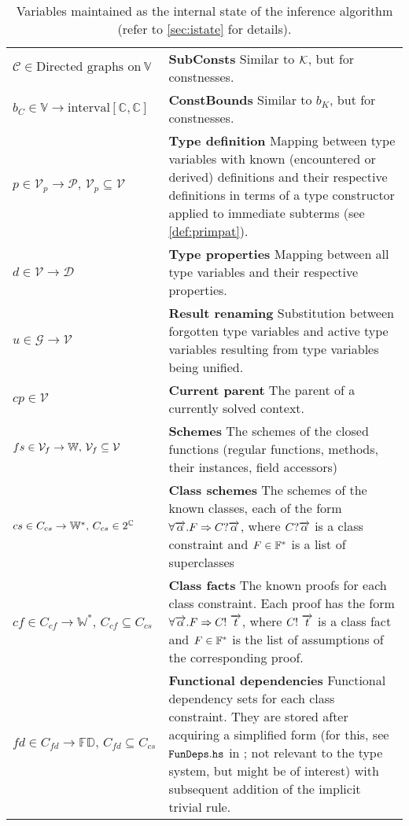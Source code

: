 \begin{table}
\begin{tabular}{p{.23\linewidth}p{.7\linewidth}}
  $\mathcal{C} \in \text{Directed graphs on}\ \mathbb{V}$ & \textbf{SubConsts}\quad
  Similar to $\mathcal{K}$, but for constnesses. \\

  $b_C \in \mathbb{V} \to \text{interval} \left[\mathbb{C}, \mathbb{C}\right]$ & \textbf{ConstBounds}\quad
  Similar to $b_K$, but for constnesses. \\

  $p \in \mathcal{V}_p \to \mathcal{P},\,\mathcal{V}_p \subseteq \mathcal{V}$ & \textbf{Type definition}\quad
  Mapping between type variables with known (encountered or derived) definitions and their respective definitions in terms of a type constructor applied to immediate subterms (see \cref{def:primpat}). \\

  $d \in \mathcal{V} \to \mathcal{D}$ & \textbf{Type properties}\quad
  Mapping between all type variables and their respective properties. \\

  $u \in \mathcal{G} \to \mathcal{V}$ & \textbf{Result renaming}\quad
  Substitution between forgotten type variables and active type variables resulting from type variables being unified. \\

  $cp \in \mathcal{V}$ & \textbf{Current parent}\quad
  The parent of a currently solved context. \\

  $fs \in \mathcal{V}_f \to \mathbb{W},\,\mathcal V_f \subseteq \mathcal V$ & \textbf{Schemes}\quad
  The schemes of the closed functions (regular functions, methods, their instances, field accessors) \\

  $cs \in C_{cs} \to \mathbb{W}^\ast,\,C_{cs} \in 2^{\mathbb{C}}$ & \textbf{Class schemes}\quad
  The schemes of the known classes, each of the form $\forall \overrightarrow{\alpha} . F \Rightarrow C?  \overrightarrow{\alpha}$, where $C?  \overrightarrow{\alpha}$ is a class constraint and $F \in {\mathbb{F}}^\ast$ is a list of superclasses \\

  $cf \in C_{cf} \to \mathbb{W}^\ast,\,C_{cf} \subseteq C_{cs}$ & \textbf{Class facts}\quad
  The known proofs for each class constraint. Each proof has the form $\forall \overrightarrow{\alpha} . F \Rightarrow C!\ \overrightarrow{t}$, where $C!\ \overrightarrow{t}$ is a class fact and $F \in {\mathbb{F}}^\ast$ is the list of assumptions of the corresponding proof. \\

  $fd \in C_{fd} \to \mathbb{FD},\,C_{fd} \subseteq C_{cs}$ & \textbf{Functional dependencies}\quad
  Functional dependency sets for each class constraint. They are stored after acquiring a simplified form (for this, see $\mathtt{FunDeps.hs}$ in \cite{klepl2022compiler}; not relevant to the type system, but might be of interest) with subsequent addition of the implicit trivial rule. \\
\bottomrule
\end{tabular}
\caption{Variables maintained as the internal state of the inference algorithm (refer to \cref{sec:istate} for details).}
\label{tab:istate}
\end{table}


